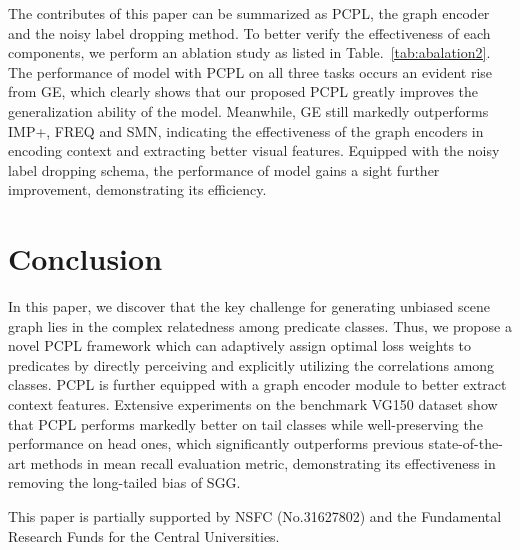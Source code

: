 \documentclass[sigconf]{acmart}
\begin{document}
The contributes of this paper can be summarized as PCPL, the graph encoder and the noisy label dropping method. To better verify the effectiveness of each components, we perform an ablation study as listed in Table.~\ref{tab:abalation2}. The performance of model with PCPL on all three tasks occurs an evident rise from GE, which clearly shows that our proposed PCPL greatly improves the generalization ability of the model. Meanwhile, GE still markedly outperforms IMP+, FREQ and SMN, indicating the effectiveness of the graph encoders in encoding context and extracting better visual features. Equipped with the noisy label dropping schema, the performance of model gains a sight further improvement, demonstrating its efficiency.

\section{Conclusion}
In this paper, we discover that the key challenge for generating unbiased scene graph lies in the complex relatedness among predicate classes. Thus, we propose a novel PCPL framework which can adaptively assign optimal loss weights to predicates by directly perceiving and explicitly utilizing the correlations among classes. PCPL is further equipped with a graph encoder module to better extract context features. Extensive experiments on the benchmark VG150 dataset show that PCPL performs markedly better on tail classes while well-preserving the performance on head ones, which significantly outperforms previous state-of-the-art methods in mean recall evaluation metric, demonstrating its effectiveness in removing the long-tailed bias of SGG.

\begin{acks}
This paper is partially supported by NSFC (No.31627802) and the
Fundamental Research Funds for the Central Universities.
\end{acks}


\balance

\end{document}
